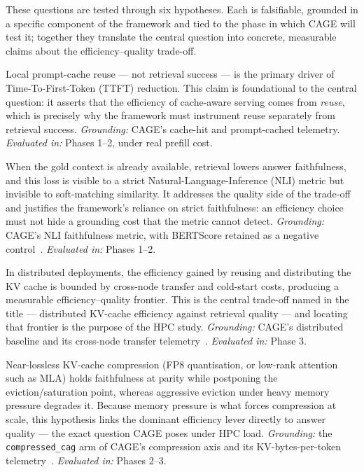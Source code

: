 These questions are tested through six hypotheses. Each is falsifiable, grounded in
a specific component of the framework and tied to the phase in which CAGE will
test it; together they translate the central question into concrete, measurable
claims about the efficiency--quality trade-off.

\begin{compactitem}
  \item[\textbf{H1}] Local prompt-cache reuse --- not retrieval success --- is the primary driver of Time-To-First-Token (TTFT) reduction. This claim is foundational to the central question: it asserts that the efficiency of cache-aware serving comes from \textit{reuse}, which is precisely why the framework must instrument reuse separately from retrieval success. \textit{Grounding:} CAGE's cache-hit and prompt-cached telemetry. \textit{Evaluated in:} Phases 1--2, under real prefill cost.
  \item[\textbf{H2}] When the gold context is already available, retrieval lowers answer faithfulness, and this loss is visible to a strict Natural-Language-Inference (NLI) metric but invisible to soft-matching similarity. It addresses the quality side of the trade-off and justifies the framework's reliance on strict faithfulness: an efficiency choice must not hide a grounding cost that the metric cannot detect. \textit{Grounding:} CAGE's NLI faithfulness metric, with BERTScore retained as a negative control~\cite{espejel2023ragas, ares2024}. \textit{Evaluated in:} Phases 1--2.
  \item[\textbf{H3}] In distributed deployments, the efficiency gained by reusing and distributing the KV cache is bounded by cross-node transfer and cold-start costs, producing a measurable efficiency--quality frontier. This is the central trade-off named in the title --- distributed KV-cache efficiency against retrieval quality --- and locating that frontier is the purpose of the HPC study. \textit{Grounding:} CAGE's distributed baseline and its cross-node transfer telemetry~\cite{zhong2024distserve, qin2024mooncake}. \textit{Evaluated in:} Phase 3.
  \item[\textbf{H4}] Near-lossless KV-cache compression (FP8 quantisation, or low-rank attention such as MLA) holds faithfulness at parity while postponing the eviction/saturation point, whereas aggressive eviction under heavy memory pressure degrades it. Because memory pressure is what forces compression at scale, this hypothesis links the dominant efficiency lever directly to answer quality --- the exact question CAGE poses under HPC load. \textit{Grounding:} the \texttt{compressed\_cag} arm of CAGE's compression axis and its KV-bytes-per-token telemetry~\cite{deepseekv2, kvtuner, chen2025pitfalls}. \textit{Evaluated in:} Phases 2--3.

\end{compactitem}
